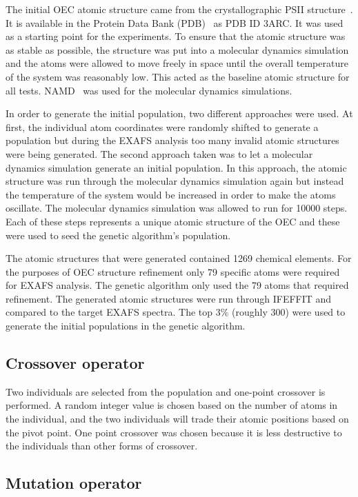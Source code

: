 \documentclass[conference]{IEEEtran}
\begin{document}
The initial OEC atomic structure came from the crystallographic PSII structure~\cite{umena2011crystal}. It is available in the Protein Data Bank (PDB)~\cite{databank} as PDB ID 3ARC. It was used as a starting point for the experiments. To ensure that the atomic structure was as stable as possible, the structure was put into a molecular dynamics simulation and the atoms were allowed to move freely in space until the overall temperature of the system was reasonably low. This acted as the baseline atomic structure for all tests. NAMD~\cite{namd} was used for the molecular dynamics simulations.

In order to generate the initial population, two different approaches were used. At first, the individual atom coordinates were randomly shifted to generate a population but during the EXAFS analysis too many invalid atomic structures were being generated. The second approach taken was to let a molecular dynamics simulation generate an initial population. In this approach, the atomic structure was run through the molecular dynamics simulation again but instead the temperature of the system would be increased in order to make the atoms oscillate. The molecular dynamics simulation was allowed to run for 10000 steps. Each of these steps represents a unique atomic structure of the OEC and these were used to seed the genetic algorithm's population.

The atomic structures that were generated contained 1269 chemical elements. For the purposes of OEC structure refinement only 79 specific atoms were required for EXAFS analysis. The genetic algorithm only used the 79 atoms that required refinement. The generated atomic structures were run through IFEFFIT and compared to the target EXAFS spectra. The top 3\% (roughly 300) were used to generate the initial populations in the genetic algorithm.

\subsection{Crossover operator}

Two individuals are selected from the population and one-point crossover is performed. A random integer value is chosen based on the number of atoms in the individual, and the two individuals will trade their atomic positions based on the pivot point. One point crossover was chosen because it is less destructive to the individuals than other forms of crossover.

\subsection{Mutation operator}
\label{subsec:mutation}
\end{document}
